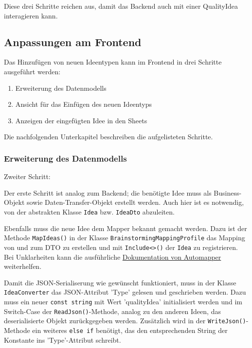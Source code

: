Diese drei Schritte reichen aus, damit das Backend auch mit einer QualityIdea interagieren kann. 

\subsection{Anpassungen am Frontend}

Das Hinzufügen von neuen Ideentypen kann im Frontend in drei Schritte ausgeführt werden:
\begin{enumerate}
	\item Erweiterung des Datenmodells
	\item Ansicht für das Einfügen des neuen Ideentyps
	\item Anzeigen der eingefügten Idee in den Sheets
\end{enumerate}
Die nachfolgenden Unterkapitel beschreiben die aufgelisteten Schritte.

\subsubsection{Erweiterung des Datenmodells}

\begin{labeling}{Zweiter Schritt:}
	\item[Erster Schritt:] Der erste Schritt ist analog zum Backend; die benötigte Idee muss als Business-Objekt sowie Daten-Transfer-Objekt erstellt werden. Auch hier ist es notwendig, von der abstrakten Klasse \texttt{Idea} bzw. \texttt{IdeaDto} abzuleiten. 
	\item[Zweiter Schritt:] Ebenfalls muss die neue Idee dem Mapper bekannt gemacht werden. Dazu ist der Methode \texttt{MapIdeas()} in der Klasse \texttt{Brainstorming\-Mapping\-Profile} das Mapping von und zum DTO zu erstellen und mit \texttt{In\-clude<>()} der \texttt{Idea} zu registrieren. Bei Unklarheiten kann die ausführliche \href{https://docs.automapper.org/en/stable/}{Dokumentation von Automapper} weiterhelfen.
	\item[Dritter Schritt:] Damit die JSON-Serialiserung wie gewünscht funktioniert, muss in der Klasse \texttt{IdeaConverter} das JSON-Attribut 'Type' gelesen und geschrieben werden. Dazu muss ein neuer \texttt{const string} mit Wert 'qualityIdea' initialisiert werden und im Switch-Case der \texttt{ReadJson()}-Methode, analog zu den anderen Ideen, das deserialisierte Objekt zurückgegeben werden. Zusätzlich wird in der \texttt{WriteJson()}-Methode ein weiteres \texttt{else if} benötigt, das den entsprechenden String der Konstante ins 'Type'-Attribut schreibt.
\end{labeling}

